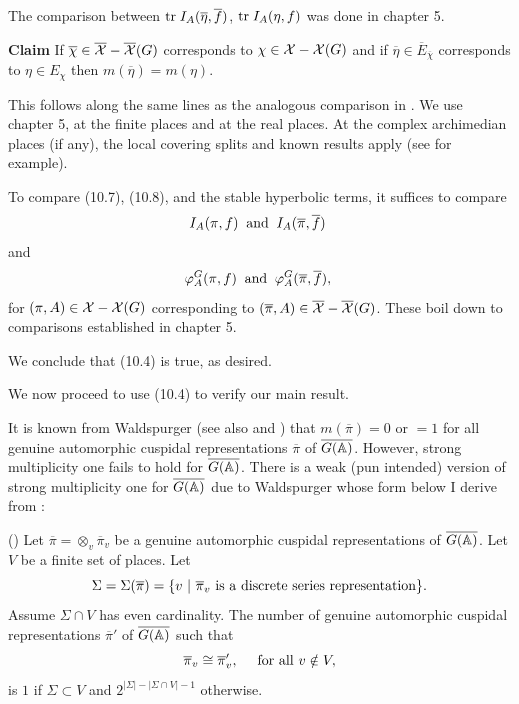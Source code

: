 The comparison between ${\rm tr}\;I_A(\overline{\eta },\overline{f})$,
${\rm tr}\;I_A(\eta ,f)$ was done in chapter 5. 

{\bf Claim}
If $\overline{\chi }\in \overline{{\cal X}}-\overline{{\cal X}}(G)$
corresponds to $\chi \in {\cal X}-{\cal X}(G)$ and if $\overline{\eta }\in 
\overline{E}_{\overline{\chi }}$ corresponds to $\eta \in E_\chi $ then
$m(\overline{\eta })=m(\eta )$.

This follows along the same lines as the analogous comparison
in \cite{Fl}. We use chapter 5, at the finite places and
\cite{Sa} at the real places. At the complex archimedian places (if any),
the local covering splits and known results apply
(see \cite{Sha} for example).

To compare (10.7), (10.8), and the stable hyperbolic terms,
it suffices to compare
\[
I_A(\pi ,f)\;\;{\rm and}\;\;I_A(\overline{\pi },\overline{f})\;
\]
and
\[
\varphi _A^G(\pi ,f)\;\;{\rm and}\;\;
\varphi _A^G(\overline{\pi },\overline{f}),\;
\]
for $(\pi ,A)\in {\cal X}-{\cal X}(G)$ corresponding to
$(\overline{\pi },A)\in \overline{{\cal X}}-\overline{{\cal X}}(G)$.
These boil down to comparisons established in chapter 5. 

We conclude that (10.4) is true, as desired.

We now proceed to use (10.4) to verify our main result.

It is known from Waldspurger \cite{Wa1} (see also
\cite{GPS} and \cite{PS})
that $m(\overline{\pi })=0$ or $=1$ for all genuine
automorphic cuspidal representations $\overline{\pi }$ of
$\overline{G({\Bbb A})}$. However, strong
multiplicity one fails to hold for $\overline{G({\Bbb A})}$.
There is a weak (pun intended) version of strong
multiplicity one for $\overline{G({\Bbb A})}$ due to Waldspurger
whose form below I derive from \cite{PS}:

\begin{lemma} (\cite{Wa2}) Let $\overline{\pi }
=\otimes_v\overline{\pi }_v$ 
be a genuine automorphic cuspidal representations of
$\overline{G({\Bbb A})}$. Let $V$ be a finite set of places. Let
\[
\Sigma=\Sigma(\overline{\pi })=\{v\ |\ 
\overline{\pi }_v\ {\rm is \ a \ discrete\ series\ representation}
\}.
\]
Assume $\Sigma\cap V$ has even cardinality.
The number of genuine automorphic cuspidal representations
$\overline{\pi}'$ of $\overline{G({\Bbb A})}$ such that
\[
\overline{\pi }_v\cong \overline{\pi }_v',\ \ \ \
{\rm for\ all\ }v\notin V,
\]
is $1$ if $\Sigma \subset V$ and $2^{|\Sigma|-|\Sigma\cap V|-1} $
otherwise.
\end{lemma}


